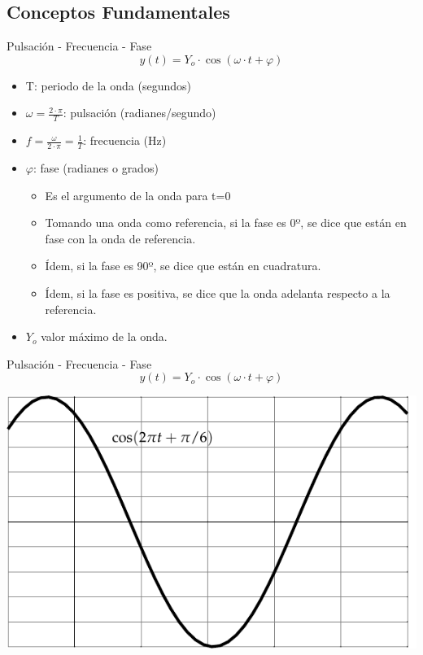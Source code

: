 \documentclass[xcolor={usenames,svgnames,dvipsnames}]{beamer}
\begin{document}
\subsection{Conceptos Fundamentales}
\label{sec:org2d2ec31}
\begin{frame}[label={sec:orge669f78}]{Pulsación - Frecuencia - Fase}
$$y(t)=Y_{o}\cdot\cos(\omega\cdot t+\varphi)$$

\begin{itemize}
\item T: periodo de la onda (segundos)

\item \(\omega=\frac{2\cdot\pi}{T}\): pulsación (radianes/segundo)

\item \(f=\frac{\omega}{2\cdot\pi}=\frac{1}{T}\): frecuencia (Hz)

\item \(\varphi\): fase (radianes o grados)

\begin{itemize}
\item Es el argumento de la onda para t=0

\item Tomando una onda como referencia, si la fase es 0º, se dice que
están en fase con la onda de referencia.

\item Ídem, si la fase es 90º, se dice que están en cuadratura.

\item Ídem, si la fase es positiva, se dice que la onda adelanta
respecto a la referencia.
\end{itemize}

\item \(Y_{o}\) valor máximo de la onda.
\end{itemize}
\end{frame}

\begin{frame}[label={sec:orgb3a6797}]{Pulsación - Frecuencia - Fase}
$$y(t)=Y_{o}\cdot\cos(\omega\cdot t+\varphi)$$

\begin{center}
\includegraphics[width=.9\linewidth]{../figs/Sin.pdf}
\end{center}
\end{frame}
\end{document}

